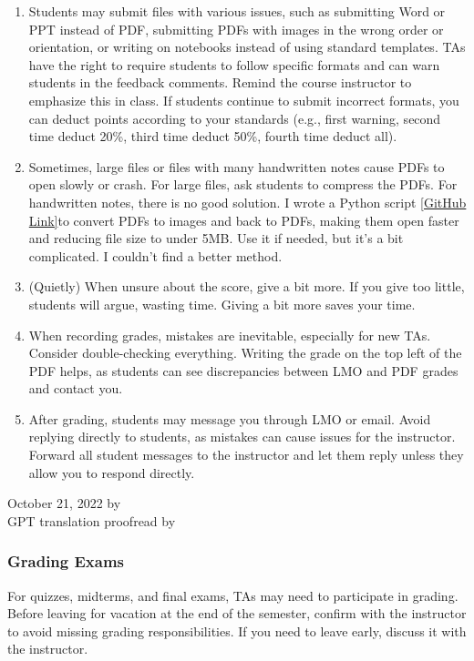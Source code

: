 \begin{enumerate}
\begin{figure}[H]
        \end{figure}
    \item Students may submit files with various issues, such as submitting Word or PPT instead of PDF, submitting PDFs with images in the wrong order or orientation, or writing on notebooks instead of using standard templates. TAs have the right to require students to follow specific formats and can warn students in the feedback comments. Remind the course instructor to emphasize this in class. If students continue to submit incorrect formats, you can deduct points according to your standards (e.g., first warning, second time deduct 20\%, third time deduct 50\%, fourth time deduct all).
    \item Sometimes, large files or files with many handwritten notes cause PDFs to open slowly or crash. For large files, ask students to compress the PDFs. For handwritten notes, there is no good solution. I wrote a Python script \href{https://github.com/xp-pgrs-unofficial-guide/xp_pgrs_unofficial_guide/blob/main/fileshare/pdf_to_png_to_pdf.py}{[GitHub Link]}to convert PDFs to images and back to PDFs, making them open faster and reducing file size to under 5MB. Use it if needed, but it’s a bit complicated. I couldn’t find a better method.
    \item (Quietly) When unsure about the score, give a bit more. If you give too little, students will argue, wasting time. Giving a bit more saves your time.
    \item When recording grades, mistakes are inevitable, especially for new TAs. Consider double-checking everything. Writing the grade on the top left of the PDF helps, as students can see discrepancies between LMO and PDF grades and contact you.
    \item After grading, students may message you through LMO or email. Avoid replying directly to students, as mistakes can cause issues for the instructor. Forward all student messages to the instructor and let them reply unless they allow you to respond directly.
\end{enumerate}

\begin{flushright}
    October 21, 2022 by \Wu \\
    GPT translation proofread by \Shiyao
\end{flushright}

\subsubsection{Grading Exams}
For quizzes, midterms, and final exams, TAs may need to participate in grading. Before leaving for vacation at the end of the semester, confirm with the instructor to avoid missing grading responsibilities. If you need to leave early, discuss it with the instructor.

